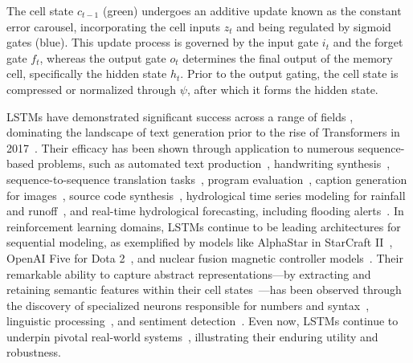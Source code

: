 The cell state $c_{t-1}$ (green) undergoes an additive update known as the constant error carousel, incorporating the cell inputs $z_t$ and being regulated by sigmoid gates (blue). This update process is governed by the input gate $i_t$ and the forget gate $f_t$, whereas the output gate $o_t$ determines the final output of the memory cell, specifically the hidden state $h_t$. Prior to the output gating, the cell state is compressed or normalized through $\psi$, after which it forms the hidden state.

LSTMs have demonstrated significant success across a range of fields \citep{Hochreiter:01,Hochreiter:07,Schmidhuber:15}, dominating the landscape of text generation prior to the rise of Transformers in 2017~\citep{Vaswani:17}. Their efficacy has been shown through application to numerous sequence-based problems, such as automated text production~\citep{Graves:13,Karpathy:15blog}, handwriting synthesis~\citep{Graves:13}, sequence-to-sequence translation tasks~\citep{Sutskever:14nips}, program evaluation~\citep{Zaremba:14arxiv}, caption generation for images~\citep{Karpathy:15,Hossain:19}, source code synthesis~\citep{Karpathy:15blog}, hydrological time series modeling for rainfall and runoff~\citep{Kratzert:18,Kratzert:19}, and real-time hydrological forecasting, including flooding alerts~\citep{Nearing:24}. In reinforcement learning domains, LSTMs continue to be leading architectures for sequential modeling, as exemplified by models like AlphaStar in StarCraft II~\citep{Vinyals:17short}, OpenAI Five for Dota 2~\citep{OpenAI:19}, and nuclear fusion magnetic controller models~\citep{Degrave:22short}. Their remarkable ability to capture abstract representations—by extracting and retaining semantic features within their cell states~\citep{Karpathy:15blog}—has been observed through the discovery of specialized neurons responsible for numbers and syntax~\citep{Lakretz:19}, linguistic processing~\citep{Bau:19}, and sentiment detection~\citep{Radford:17arxiv}. Even now, LSTMs continue to underpin pivotal real-world systems~\citep{Degrave:22short,Nearing:24}, illustrating their enduring utility and robustness.

